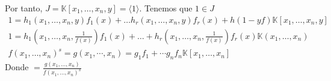 \documentclass[ACGA.tex]{subfiles}
\begin{document}
Por tanto, $J=\mathbb{K}[x_1,\dotsc,x_n,y]=\langle 1 \rangle$. Tenemos que $1\in J$ 
\begin{align*}
1=h_1(x_1,\dotsc,x_n,y)f_1(x)+\dotsc h_r(x_1,\dotsc,x_n,y) f_r(x)+ h(1-yf) \mathbb{K}[x_1,\dotsc,x_n,y]\\
 1 = h_1(x_1,\dotsc,x_n,\frac{1}{f(x)})f_1(x)+\dotsc+h_r(x_1,\dotsc,x_n,\frac{1}{f(x)})f_r(x)  \mathbb{K}(x_1,\dotsc,x_n)\\
 f(x_1,\dotsc,x_n)^s = g(x_1,\cdots,x_n) = g_1 f_1 + \cdots g_n f_n \mathbb{K}[x_1,\dotsc,x_n]
\end{align*}
Donde $ = \frac{g(x_1,\dotsc,x_n)}{f(x_1,\dotsc,x_n)^s}$
\end{document}
